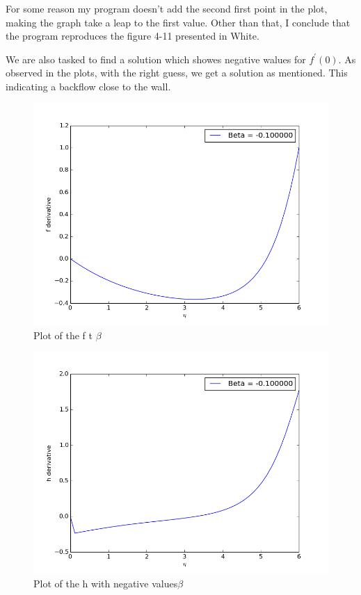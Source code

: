 \documentclass[a4paper,norsk]{article}
\begin{document}
\newpage
For some reason my program doesn't add the second first point in the plot, making the graph take a leap to the first value. Other than that, I conclude that the program reproduces the figure 4-11 presented in White.
\newline

We are also tasked to find a solution which showes negative walues for $f^\prime (0)$. As observed in the plots, with the right guess, we get a solution as mentioned. This indicating a backflow close to the wall.
\begin{figure}[h!]	
	\centering
	\caption*{Plot of the f t $\beta$ }
	\includegraphics[scale = 0.55]{mand1/fneg.png}
\end{figure}
\begin{figure}[h!]
	\centering
	\caption*{Plot of the h with negative values$\beta$}
	\includegraphics[scale = 0.6]{mand1/hneg.png}
\end{figure}
\end{document}
